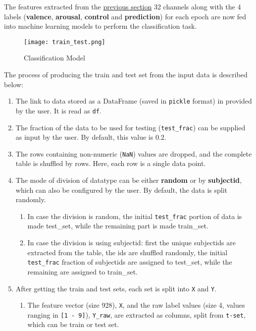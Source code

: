 The features extracted from the \hyperref[sec:featureExtraction]{previous section} 32 channels along with the 4 labels (\textbf{valence}, \textbf{arousal}, \textbf{control} and \textbf{prediction}) for each epoch are now fed into machine learning models to perform the classification task.

\begin{figure}[H]
\hspace*{-1.5cm}
\texttt{[image: train\_test.png]}
\caption{Classification Model}
\label{fig-5-6}
\end{figure}

The process of producing the train and test set from the input data is described below:
\begin{enumerate}
    \item The link to data stored as a DataFrame (saved in \texttt{pickle} format) in provided by the user. It is read as \texttt{df}.
    \item The fraction of the data to be used for testing (\texttt{test\_frac}) can be supplied as input by the user. By default, this value is 0.2.
    \item The rows containing non-numeric (\texttt{NaN}) values are dropped, and the complete table is shuffled by rows. Here, each row is a single data point.
    \item The mode of division of datatype can be either \textbf{random} or by \textbf{subjectid}, which can also be configured by the user. By default, the data is split randomly.
    \begin{enumerate}
        \item In case the division is random, the initial \texttt{test\_frac} portion of data is made test\_set, while the remaining part is made train\_set.
        \item In case the division is using subjectid: first the unique subjectids are extracted from the table, the ids are shuffled randomly, the initial \texttt{test\_frac} fraction of subjectids are assigned to test\_set, while the remaining are assigned to train\_set.
    \end{enumerate}
    \item After getting the train and test sets, each set is split into \texttt{X} and \texttt{Y}.
    \begin{enumerate}
        \item The feature vector (size 928), \texttt{X}, and the raw label values (size 4, values ranging in \texttt{[1 - 9]}), \texttt{Y\_raw}, are extracted as columns, split from \texttt{t-set}, which can be train or test set.

\end{enumerate}
\end{enumerate}
